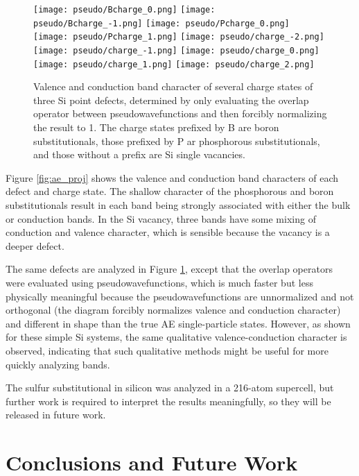 \documentclass[12pt]{article}
\begin{document}
\begin{figure}
\texttt{[image: pseudo/Bcharge\_0.png]}
\texttt{[image: pseudo/Bcharge\_-1.png]}
\texttt{[image: pseudo/Pcharge\_0.png]}
\texttt{[image: pseudo/Pcharge\_1.png]}
\texttt{[image: pseudo/charge\_-2.png]}
\texttt{[image: pseudo/charge\_-1.png]}
\texttt{[image: pseudo/charge\_0.png]}
\texttt{[image: pseudo/charge\_1.png]}
\texttt{[image: pseudo/charge\_2.png]}
\caption{Valence and conduction band character of several charge states
of three Si point defects, determined by only evaluating
the overlap operator between pseudowavefunctions and then forcibly
normalizing the result to 1. The charge states prefixed by B are
boron substitutionals, those prefixed by P ar phosphorous substitutionals,
and those without a prefix are Si single vacancies.}
\label{fig:ps_proj}
\end{figure}

Figure \ref{fig:ae_proj} shows the valence and conduction band characters of
each defect and charge state. The shallow character of the phosphorous and boron
substitutionals result in each band being strongly associated with either the bulk
or conduction bands. In the Si vacancy, three bands have some mixing of conduction
and valence character, which is sensible because the vacancy is a deeper defect.

The same defects are analyzed in Figure \ref{fig:ps_proj}, except that the overlap
operators were evaluated using pseudowavefunctions, which is much faster but
less physically meaningful because the pseudowavefunctions are unnormalized
and not orthogonal (the
diagram forcibly normalizes valence and conduction character) and
different in shape than the true AE single-particle states. However, as shown
for these simple Si systems, the same qualitative valence-conduction character is
observed, indicating that such qualitative methods might be useful for more quickly
analyzing bands.

The sulfur substitutional in silicon was analyzed in a 216-atom supercell,
but further work is required to interpret the results meaningfully, so they
will be released in future work.

\section{Conclusions and Future Work}
\end{document}
